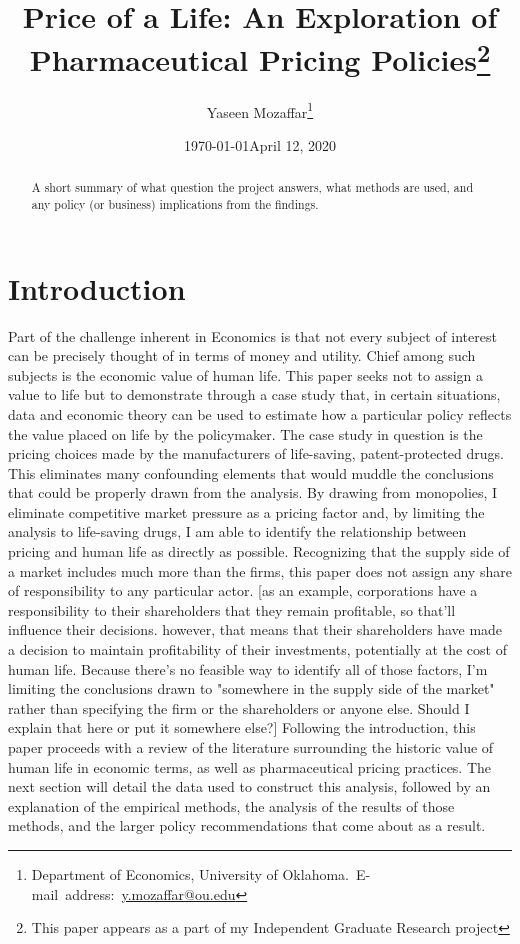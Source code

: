 \documentclass[12pt,english]{article} \usepackage{mathptmx}
\begin{document}
 \begin{singlespace} 
\title{Price of a Life: An Exploration of Pharmaceutical Pricing 
Policies\thanks{This paper appears as a part of my Independent Graduate 
Research project}} \end{singlespace} \author{Yaseen 
Mozaffar\thanks{Department of Economics, University of Oklahoma.\ 
E-mail~address:~\href{mailto:y.mozaffar@ou.edu}{y.mozaffar@ou.edu}}} %
\date{\today} \date{April 12, 2020} \maketitle \begin{abstract} 
\begin{singlespace} A short summary of what question the project 
answers, what methods are used, and any policy (or business) 
implications from the findings. \end{singlespace} \end{abstract} 
\vfill{} \pagebreak{} \section{Introduction}\label{sec:intro} Part of 
the challenge inherent in Economics is that not every subject of 
interest can be precisely thought of in terms of money and utility. 
Chief among such subjects is the economic value of human life. This 
paper seeks not to assign a value to life but to demonstrate through a 
case study that, in certain situations, data and economic theory can be 
used to estimate how a particular policy reflects the value placed on 
life by the policymaker. The case study in question is the pricing 
choices made by the manufacturers of life-saving, patent-protected 
drugs. This eliminates many confounding elements that would muddle the 
conclusions that could be properly drawn from the analysis. By drawing 
from monopolies, I eliminate competitive market pressure as a pricing 
factor and, by limiting the analysis to life-saving drugs, I am able to 
identify the relationship between pricing and human life as directly as 
possible. Recognizing that the supply side of a market includes much 
more than the firms, this paper does not assign any share of 
responsibility to any particular actor. [as an example, corporations 
have a responsibility to their shareholders that they remain profitable, 
so that'll influence their decisions. however, that means that their 
shareholders have made a decision to maintain profitability of their 
investments, potentially at the cost of human life. Because there's no 
feasible way to identify all of those factors, I'm limiting the 
conclusions drawn to "somewhere in the supply side of the market" rather 
than specifying the firm or the shareholders or anyone else. Should I 
explain that here or put it somewhere else?] Following the introduction, 
this paper proceeds with a review of the literature surrounding the 
historic value of human life in economic terms, as well as 
pharmaceutical pricing practices. The next section will detail the data 
used to construct this analysis, followed by an explanation of the 
empirical methods, the analysis of the results of those methods, and the 
larger policy recommendations that come about as a result. 
\end{document}
